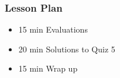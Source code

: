 \begin{frame}
    \frametitle{Lesson Plan}
    \begin{itemize}
        \item 15 min Evaluations
        \item 20 min Solutions to Quiz 5
        \item 15 min Wrap up
    \end{itemize}
\end{frame}
    
